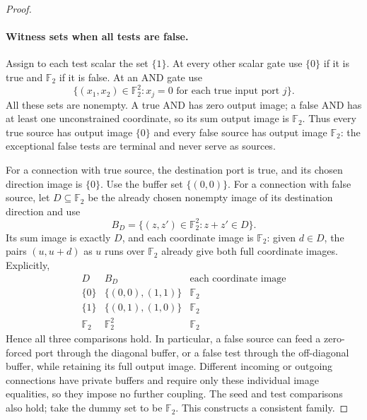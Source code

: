 \documentclass[11pt]{article}
\theoremstyle{definition}
\begin{document}
\begin{proof}
\paragraph{Witness sets when all tests are false.}
Assign to each test scalar the set $\{1\}$. At every other scalar gate
use $\{0\}$ if it is true and $\mathbb F_2$ if it is false. At an AND gate use
\begin{equation}\label{eq:consistency-and-witness}
 \{(x_1,x_2)\in\mathbb F_2^2:
       x_j=0\text{ for each true input port }j\}.
\end{equation}
All these sets are nonempty. A true AND has zero output image; a false
AND has at least one unconstrained coordinate, so its sum output image
is $\mathbb F_2$. Thus every true source has output image $\{0\}$ and every
false source has output image $\mathbb F_2$: the exceptional false tests are
terminal and never serve as sources.

For a connection with true source, the destination port is true, and its
chosen direction image is $\{0\}$. Use the buffer set $\{(0,0)\}$.
For a connection with false source, let $D\subseteq\mathbb F_2$ be the already
chosen nonempty image of its destination direction and use
\begin{equation}\label{eq:consistency-fiber}
 B_D=\{(z,z')\in\mathbb F_2^2:z+z'\in D\}.
\end{equation}
Its sum image is exactly $D$, and each coordinate image is $\mathbb F_2$:
given $d\in D$, the pairs $(u,u+d)$ as $u$ runs over $\mathbb F_2$ already
give both full coordinate images. Explicitly,
\[
\begin{array}{c|c|c}
 D & B_D & \text{each coordinate image}\\ \hline
 \{0\} & \{(0,0),(1,1)\} & \mathbb F_2\\
 \{1\} & \{(0,1),(1,0)\} & \mathbb F_2\\
 \mathbb F_2 & \mathbb F_2^2 & \mathbb F_2
\end{array}
\]
Hence all three comparisons hold. In particular, a false source can feed
a zero-forced port through the diagonal buffer, or a false test through
the off-diagonal buffer, while retaining its full output image. Different
incoming or outgoing connections have private buffers and require only
these individual image equalities, so they impose no further coupling.
The seed and test comparisons also hold; take the dummy set to be $\mathbb F_2$.
This constructs a consistent family.


\end{proof}
\end{document}
